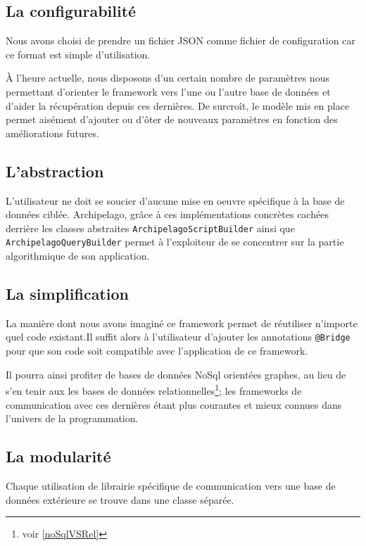 \documentclass[a4paper,fleqn,12pt]{report}
\begin{document}
\subsection{La configurabilité}

Nous avons choisi de prendre un fichier JSON comme fichier de configuration car ce format est simple d'utilisation. 

\`A l'heure actuelle, nous disposons d'un certain nombre de paramètres nous permettant d'orienter le framework vers l'une ou l'autre base de données et d'aider la récupération depuis ces dernières. De surcroît, le modèle mis en place permet aisément d'ajouter ou d'ôter de nouveaux paramètres en fonction des améliorations futures. 

\subsection{L'abstraction}

L'utilisateur ne doit se soucier d'aucune mise en oeuvre spécifique à la base de données ciblée. Archipelago, grâce à ces  implémentations concrètes cachées derrière les classes abstraites \texttt{ArchipelagoScriptBuilder} ainsi que \texttt{ArchipelagoQueryBuilder} permet à l'exploiteur de se concentrer sur la partie algorithmique de son application.

\subsection{La simplification}

La manière dont nous avons imaginé ce framework permet de réutiliser n'importe quel code existant.Il suffit alors à l'utilisateur d'ajouter les annotations \texttt{@Bridge} pour que son code soit compatible avec l'application de ce framework. 

Il pourra ainsi profiter de bases de données NoSql orientées graphes, au lieu de s'en tenir aux les bases de données relationnelles\footnote{voir \ref{noSqlVSRel}}; les frameworks de communication avec ces dernières étant plus courantes et mieux connues dans l'univers de la programmation.

\subsection{La modularité}

Chaque utilisation de librairie spécifique de communication vers une base de données extérieure se trouve dans une classe séparée.
\end{document}
